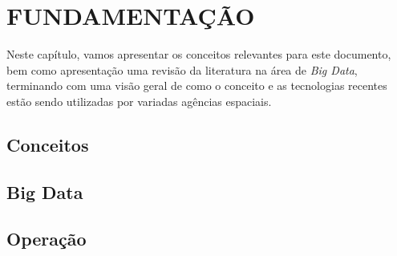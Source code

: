 
\chapter{FUNDAMENTAÇÃO}

Neste capítulo, vamos apresentar os conceitos relevantes para este documento, bem como apresentação uma revisão da literatura na área de \textit{Big Data}, terminando com uma visão geral de como o conceito e as tecnologias recentes estão sendo utilizadas por variadas agências espaciais.

\section{Conceitos}

\section{Big Data}

\section{Operação}

